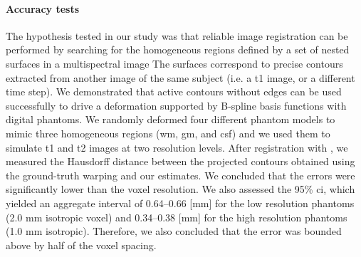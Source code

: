 \paragraph*{Accuracy tests}
The hypothesis tested in our study was that reliable image registration can be performed
  by searching for the homogeneous regions defined by a set of nested surfaces in a
  multispectral image
The surfaces correspond to precise contours extracted from another image of the same subject
  (i.e. a \gls*{t1} image, or a different time step).
We demonstrated that active contours without edges can be used successfully to drive a
  deformation supported by B-spline basis functions with digital phantoms.
We randomly deformed four different phantom models to mimic three homogeneous regions
  (\gls*{wm}, \gls*{gm}, and \acrlong*{csf}) and we used them to simulate \gls*{t1} and \gls*{t2}
  images at two resolution levels.
After registration with \regseg{}, we measured the Hausdorff distance between the
  projected contours obtained using the ground-truth warping and our estimates.
We concluded that the errors were significantly lower than the voxel resolution.
We also assessed the 95\% \gls*{ci}, which yielded an aggregate interval of
  0.64--0.66 [mm] for the low resolution phantoms (2.0 mm isotropic voxel) and
  0.34--0.38 [mm] for the high resolution phantoms (1.0 mm isotropic).
Therefore, we also concluded that the error was bounded above by half of the
  voxel spacing.
\newcomment[RV\#1(C.8)]{%
The distributions of errors along surfaces vary importantly depending on the shape of the
  phantom (see \autoref{fig:phantom}B).
The misregistration error of the ``gyrus'' phantom showed a much lower spread than that
  for the other shapes.
We argue that the symmetry of those other shapes posed difficulties in driving the contours
  towards the appropriate region and producing some ``sliding'' effect between the
  faces of the surfaces and their ground-truth position.
This effect should not be present in real datasets, thanks to the very convoluted cortical
  layer, and the directional restriction of distortion.}

